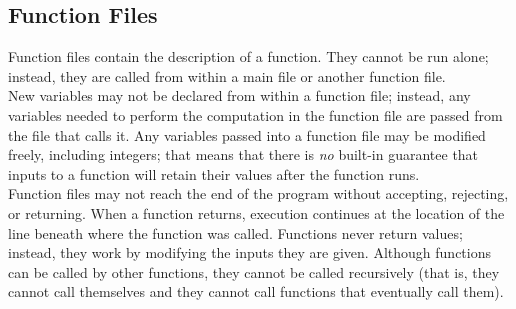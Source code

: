 \documentclass[11pt]{report}
\begin{document}

\subsection{Function Files}

Function files contain the description of a function. They cannot be run alone; instead, they are called from within a main file or another function file. \\
  
New variables may not be declared from within a function file; instead, any variables needed to perform the computation in the function file are passed from the file that calls it. Any variables passed into a function file may be modified freely, including integers; that means that there is \emph{no} built-in guarantee that inputs to a function will retain their values after the function runs. \\

Function files may not reach the end of the program without accepting, rejecting, or returning. When a function returns, execution continues at the location of the line beneath where the function was called. Functions never return values; instead, they work by modifying the inputs they are given. Although functions can be called by other functions, they cannot be called recursively (that is, they cannot call themselves and they cannot call functions that eventually call them). \\
\end{document}
